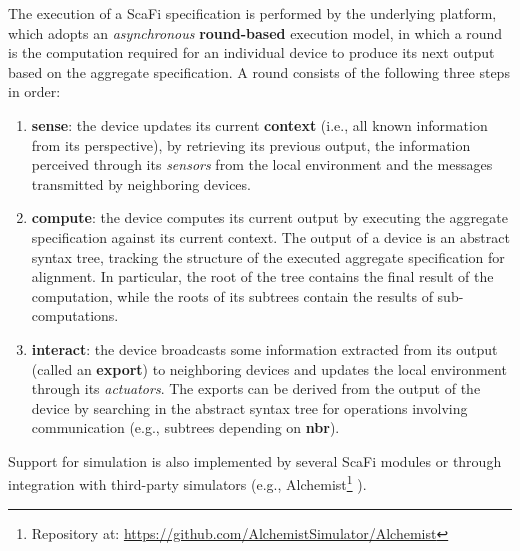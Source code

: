 The execution of a \ac{ScaFi} specification is performed by the underlying
platform, which adopts an \textit{asynchronous} \textbf{round-based} execution
model, in which a round is the computation required for an individual device to
produce its next output based on the aggregate specification. A round consists
of the following three steps in order:
\begin{enumerate}
  \item \textbf{sense}: the device updates its current \textbf{context} (i.e.,
        all known information from its perspective), by retrieving its previous
        output, the information perceived through its \textit{sensors} from the
        local environment and the messages transmitted by neighboring devices.
  \item \textbf{compute}: the device computes its current output by executing
        the aggregate specification against its current context. The output of
        a device is an abstract syntax tree, tracking the structure of the
        executed aggregate specification for alignment. In particular, the root
        of the tree contains the final result of the computation, while the
        roots of its subtrees contain the results of sub-computations.
  \item \textbf{interact}: the device broadcasts some information extracted
        from its output (called an \textbf{export}) to neighboring devices and
        updates the local environment through its \textit{actuators}. The
        exports can be derived from the output of the device by searching in the
        abstract syntax tree for operations involving communication (e.g.,
        subtrees depending on \textbf{nbr}).
\end{enumerate}

Support for simulation is also implemented by several \ac{ScaFi} modules or
through integration with third-party simulators (e.g.,
Alchemist\footnote{Repository at:
\url{https://github.com/AlchemistSimulator/Alchemist}} \cite{Alchemist}).
